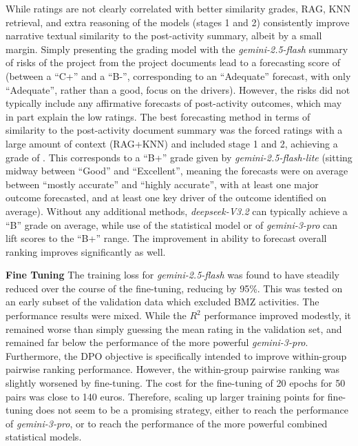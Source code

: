 While ratings are not clearly correlated with better similarity grades, RAG, KNN retrieval, and extra reasoning of the models (stages 1 and 2) consistently improve narrative textual similarity to the post-activity summary, albeit by a small margin. Simply presenting the grading model with the \emph{gemini-2.5-flash} summary of risks of the project from the project documents lead to a forecasting score of \RisksOnlyGrade{} (between a ``C+'' and a ``B-'', corresponding to an ``Adequate'' forecast, with only ``Adequate'', rather than a good, focus on the drivers). However, the risks did not typically include any affirmative forecasts of post-activity outcomes, which may in part explain the low ratings. The best forecasting method in terms of similarity to the post-activity document summary was the forced ratings with a large amount of context (RAG+KNN) and included stage 1 and 2, achieving a grade of \BestNarrativeGrade{}. This corresponds to a ``B+'' grade given by \emph{gemini-2.5-flash-lite} (sitting midway between ``Good'' and ``Excellent'', meaning the forecasts were on average between ``mostly accurate'' and ``highly accurate'', with at least one major outcome forecasted, and at least one key driver of the outcome identified on average). Without any additional methods, \emph{deepseek-V3.2} can typically achieve a ``B'' grade on average, while use of the statistical model or of \emph{gemini-3-pro} can lift scores to the ``B+'' range. The improvement in ability to forecast overall ranking improves significantly as well.

\textbf{Fine Tuning}
The training loss for \emph{gemini-2.5-flash} was found to have steadily reduced over the course of the fine-tuning, reducing by 95\%. This was tested on an early subset of the validation data which excluded BMZ activities. The performance results were mixed. While the $R^2$ performance improved modestly, it remained worse than simply guessing the mean rating in the validation set, and remained far below the performance of the more powerful \emph{gemini-3-pro}. Furthermore, the DPO objective is specifically intended to improve within-group pairwise ranking performance. However, the within-group pairwise ranking was slightly worsened by fine-tuning. The cost for the fine-tuning of 20 epochs for 50 pairs was close to 140 euros. Therefore, scaling up larger training points for fine-tuning does not seem to be a promising strategy, either to reach the performance of \emph{gemini-3-pro}, or to reach the performance of the more powerful combined statistical models.

